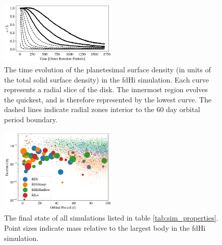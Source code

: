 \documentclass[twocolumn]{aastex63}
\begin{document}
\begin{figure}
\begin{center}
    \includegraphics[width=0.5\textwidth]{figures/pl_frac_time.png}
    \caption{The time evolution of the planetesimal surface density (in units of the total solid surface density) in the fdHi simulation. Each curve represents a radial slice of the disk. The innermost region evolves the quickest, and is therefore represented by the lowest curve. The dashed lines indicate radial zones interior to the 60 day orbital period boundary.\label{fig:pl_frac_time}}
\end{center}
\end{figure}

\begin{figure}
\begin{center}
    \includegraphics[width=0.5\textwidth]{figures/surfden_profiles.png}
    \caption{The final state of all simulations listed in table \ref{tab:sim_properties}. Point sizes indicate mass relative to the largest body in the fdHi simulation.\label{fig:surfden_profiles}}
\end{center}
\end{figure}
\end{document}
